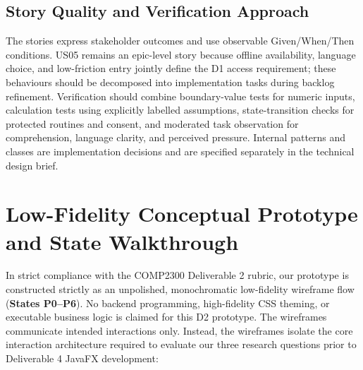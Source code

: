 \documentclass[12pt, a4paper]{article}
\begin{document}
\subsection{Story Quality and Verification Approach}
The stories express stakeholder outcomes and use observable Given/When/Then conditions. US05 remains an epic-level story because offline availability, language choice, and low-friction entry jointly define the D1 access requirement; these behaviours should be decomposed into implementation tasks during backlog refinement. Verification should combine boundary-value tests for numeric inputs, calculation tests using explicitly labelled assumptions, state-transition checks for protected routines and consent, and moderated task observation for comprehension, language clarity, and perceived pressure. Internal patterns and classes are implementation decisions and are specified separately in the technical design brief.

\section{Low-Fidelity Conceptual Prototype and State Walkthrough}
In strict compliance with the COMP2300 Deliverable 2 rubric, our prototype is constructed strictly as an unpolished, monochromatic low-fidelity wireframe flow (\textbf{States P0--P6}). No backend programming, high-fidelity CSS theming, or executable business logic is claimed for this D2 prototype. The wireframes communicate intended interactions only. Instead, the wireframes isolate the core interaction architecture required to evaluate our three research questions prior to Deliverable 4 JavaFX development:
\end{document}
